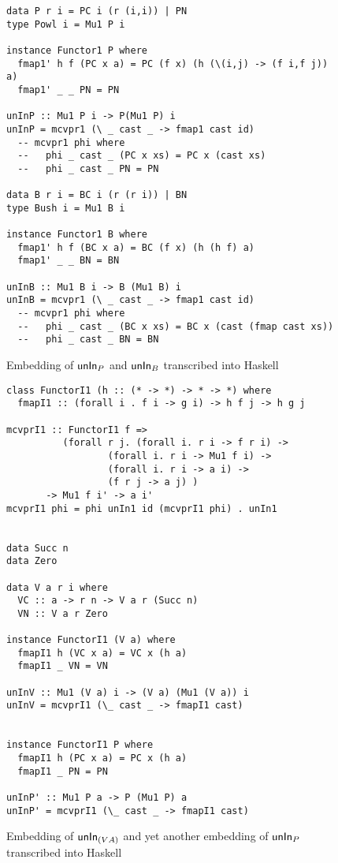 \begin{figure}
\begin{singlespace}
\begin{lstlisting}
data P r i = PC i (r (i,i)) | PN
type Powl i = Mu1 P i

instance Functor1 P where
  fmap1' h f (PC x a) = PC (f x) (h (\(i,j) -> (f i,f j)) a)
  fmap1' _ _ PN = PN

unInP :: Mu1 P i -> P(Mu1 P) i
unInP = mcvpr1 (\ _ cast _ -> fmap1 cast id)
  -- mcvpr1 phi where
  --   phi _ cast _ (PC x xs) = PC x (cast xs)
  --   phi _ cast _ PN = PN

data B r i = BC i (r (r i)) | BN
type Bush i = Mu1 B i

instance Functor1 B where
  fmap1' h f (BC x a) = BC (f x) (h (h f) a)
  fmap1' _ _ BN = BN

unInB :: Mu1 B i -> B (Mu1 B) i
unInB = mcvpr1 (\ _ cast _ -> fmap1 cast id)
  -- mcvpr1 phi where
  --   phi _ cast _ (BC x xs) = BC x (cast (fmap cast xs))
  --   phi _ cast _ BN = BN
\end{lstlisting}
\end{singlespace}
\caption{Embedding of $\mathsf{unIn}_P$ and $\mathsf{unIn}_B$ transcribed into Haskell}
\label{fig:HaskellunInNested}
\end{figure}

\begin{figure}
\begin{singlespace}
\begin{lstlisting}
class FunctorI1 (h :: (* -> *) -> * -> *) where
  fmapI1 :: (forall i . f i -> g i) -> h f j -> h g j

mcvprI1 :: FunctorI1 f =>
          (forall r j. (forall i. r i -> f r i) ->
                  (forall i. r i -> Mu1 f i) ->
                  (forall i. r i -> a i) ->
                  (f r j -> a j) )
       -> Mu1 f i' -> a i'
mcvprI1 phi = phi unIn1 id (mcvprI1 phi) . unIn1


data Succ n
data Zero

data V a r i where
  VC :: a -> r n -> V a r (Succ n)
  VN :: V a r Zero

instance FunctorI1 (V a) where
  fmapI1 h (VC x a) = VC x (h a)
  fmapI1 _ VN = VN

unInV :: Mu1 (V a) i -> (V a) (Mu1 (V a)) i
unInV = mcvprI1 (\_ cast _ -> fmapI1 cast)


instance FunctorI1 P where
  fmapI1 h (PC x a) = PC x (h a)
  fmapI1 _ PN = PN

unInP' :: Mu1 P a -> P (Mu1 P) a
unInP' = mcvprI1 (\_ cast _ -> fmapI1 cast)
\end{lstlisting}
\end{singlespace}
\caption{Embedding of $\mathsf{unIn}_{(V A)}$ and
	yet another embedding of $\mathsf{unIn}_P$\\ transcribed into Haskell}
\label{fig:HaskellunInIndexed}
\end{figure}


